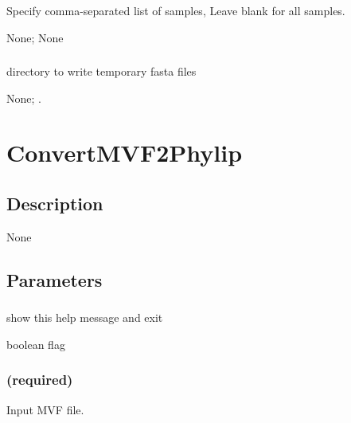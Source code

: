 \documentclass[letterpaper,11pt,english]{sphinxmanual}
\begin{document}
\subsubsection{}
\label{\detokenize{prog_desc:samples}}
 Specify comma-separated list of samples, Leave blank for all samples.

 None;  None


\subsubsection{}
\label{\detokenize{prog_desc:temp-dir-tempdir}}
 directory to write temporary fasta files

 None;  .


\section{ConvertMVF2Phylip}
\label{\detokenize{prog_desc:convertmvf2phylip}}

\subsection{Description}
\label{\detokenize{prog_desc:id19}}
None


\subsection{Parameters}
\label{\detokenize{prog_desc:id20}}

\subsubsection{}
\label{\detokenize{prog_desc:id21}}
 show this help message and exit

 boolean flag


\subsubsection{ (required)}
\label{\detokenize{prog_desc:id22}}
 Input MVF file.
\end{document}
